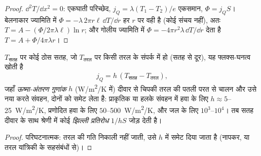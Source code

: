 \begin{proof}
$\dd^2T/\dd x^2 = 0$: एकघाती परिच्छेद, $j_Q = \lambda(T_1 - T_2)/e$
एकसमान, $\Phi = j_QS$। बेलनाकार ज्यामिति में $\Phi = -\lambda\,2\pi
r\ell\,\dd T/\dd r$ हर $r$ पर वही है (कोई संचय नहीं), अतः
$T = A - (\Phi/2\pi\lambda\ell)\ln r$; और गोलीय ज्यामिति में $\Phi =
-4\pi r^2\lambda\,\dd T/\dd r$ देता है $T = A + \Phi/4\pi\lambda r$।
\end{proof}

\begin{proposition}[किसी तरल के साथ विनिमय: न्यूटन का नियम]\label{prop:b2:heat-conduction:newton}
$T_{\text{सतह}}$ पर कोई ठोस सतह, जो $T_{\text{तरल}}$ पर किसी तरल के संपर्क में हो
(सतह से दूर), यह फ्लक्स-घनत्व खोती है
\[
j_Q = h\,(T_{\text{सतह}} - T_{\text{तरल}}) ,
\]
जहाँ \emph{ऊष्मा-अंतरण गुणांक} $h$ (\unit{W/m^2/K} में) दीवार से चिपकी तरल की पतली परत से
चालन और उसे नया करते संवहन, दोनों को समेट लेता है:
प्राकृतिक या हलके संवहन में हवा के लिए $h \approx 5$--\qty{25}{W/m^2/K},
प्रणोदित हवा के लिए $50$--\qty{500}{W/m^2/K}, और जल के लिए $10^3$--$10^4$।
तब सतह दीवार के साथ श्रेणी में कोई \emph{झिल्ली प्रतिरोध} $1/hS$ जोड़ देती है।
\end{proposition}

\begin{proof}
परिघटनात्मक: तरल की गति निकाली नहीं जाती, उसे
$h$ में समेट दिया जाता है (नापकर, या तरल यांत्रिकी के सहसंबंधों से)।
\end{proof}

